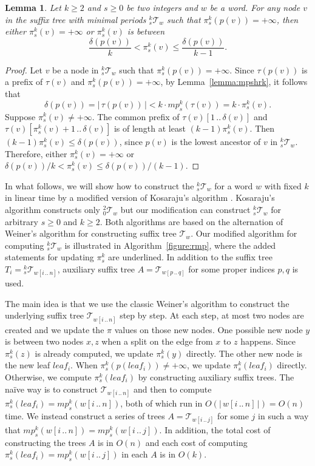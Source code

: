 \documentclass{article}
\def\subw#1#2#3{{#1[#2\,..\,#3]}}
\def\abs#1{{|\,#1\,|}}
\def\tree{\mathcal{T}}
\newtheorem{lemma}[theorem]{Lemma}
\begin{document}
\begin{lemma}\label{lemma:mpbond}
Let $k\geq2$ and $s\geq0$ be two integers and $w$ be a word. For any
node $v$ in the suffix tree with minimal periods ${}_s^k\tree_w$
such that $\pi_s^k(p(v))=+\infty$, then either $\pi_s^k(v)=+\infty$
or $\pi_s^k(v)$ is between
  \[\frac{\delta(p(v))}{k}<\pi_s^k(v)\leq\frac{\delta(p(v))}{k-1}.\]
\end{lemma}
\begin{proof}
Let $v$ be a node in ${}_s^k\tree_w$ such that
$\pi_s^k(p(v))=+\infty$. Since $\tau(p(v))$ is a prefix of $\tau(v)$
and $\pi_s^k(p(v))=+\infty$, by Lemma~\ref{lemma:mpshrk}, it follows
that
  \[\delta(p(v))=\abs{\tau(p(v))}<k\cdot mp_s^k(\tau(v))=k\cdot\pi_s^k(v).\]
Suppose $\pi_s^k(v)\neq+\infty$. The common prefix of
$\subw{\tau(v)}{1}{\delta(v)}$ and
$\subw{\tau(v)}{\pi_s^k(v)+1}{\delta(v)}$ is of length at least
$(k-1)\pi_s^k(v)$. Then $(k-1)\pi_s^k(v)\leq\delta(p(v))$, since
$p(v)$ is the lowest ancestor of $v$ in ${}_s^k\tree_w$. Therefore,
either $\pi_s^k(v)=+\infty$ or
$\delta(p(v))/k<\pi_s^k(v)\leq\delta(p(v))/(k-1)$.
\end{proof}


In what follows, we will show how to construct the ${}_s^k\tree_w$
for a word $w$ with fixed $k$ in linear time by a modified version
of Kosaraju's algorithm \cite{Kosaraju1994}. Kosaraju's algorithm
constructs only ${}_0^2\tree_w$ but our modification can construct
${}_s^k\tree_w$ for arbitrary $s\geq0$ and $k\geq 2$. Both
algorithms are based on the alternation of Weiner's algorithm
\cite{Weiner1973} for constructing suffix tree $\tree_w$. Our
modified algorithm for computing ${}_s^k\tree_w$ is illustrated in
Algorithm~\ref{figure:rmp}, where the added statements for updating
$\pi_s^k$ are underlined. In addition to the suffix tree
$T_i={}_s^k\tree_{\subw{w}{i}{n}}$, auxiliary suffix tree
$A=\tree_{\subw{w}{p}{q}}$ for some proper indices $p,q$ is used.


The main idea is that we use the classic Weiner's algorithm to
construct the underlying suffix tree $\tree_{\subw{w}{i}{n}}$ step
by step. At each step, at most two nodes are created and we update
the $\pi$ values on those new nodes. One possible new node $y$ is
between two nodes $x,z$ when a split on the edge from $x$ to $z$
happens. Since $\pi_s^k(z)$ is already computed, we update
$\pi_s^k(y)$ directly. The other new node is the new leaf $leaf_i$.
When $\pi_s^k(p(leaf_i))\neq+\infty$, we update $\pi_s^k(leaf_i)$
directly. Otherwise, we compute $\pi_s^k(leaf_i)$ by constructing
auxiliary suffix trees. The na\"ive way is to construct
$\tree_{\subw{w}{i}{n}}$ and then to compute
$\pi_s^k(leaf_i)=mp_s^k(\subw{w}{i}{n})$, both of which run in
$O(\abs{\subw{w}{i}{n}})=O(n)$ time. We instead construct a series
of trees $A=\tree_{\subw{w}{i}{j}}$ for some $j$ in such a way that
$mp_s^k(\subw{w}{i}{n})=mp_s^k(\subw{w}{i}{j})$. In addition, the
total cost of constructing the trees $A$ is in $O(n)$ and each cost
of computing $\pi_s^k(leaf_i)=mp_s^k(\subw{w}{i}{j})$ in each $A$ is
in $O(k)$.
\end{document}

